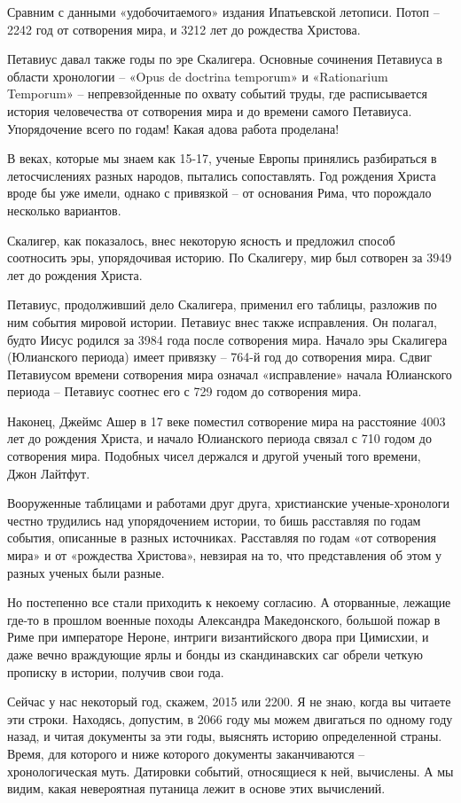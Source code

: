 Сравним с данными «удобочитаемого» издания Ипатьевской летописи. Потоп – 2242 год от сотворения мира, и 3212 лет до рождества Христова.

Петавиус давал также годы по эре Скалигера. Основные сочинения Петавиуса в области хронологии –  «Opus de doctrina temporum» и «Rationarium Temporum» – непревзойденные по охвату событий труды, где расписывается история человечества от сотворения мира и до времени самого Петавиуса. Упорядочение всего по годам! Какая адова работа проделана!

В веках, которые мы знаем как 15-17, ученые Европы принялись разбираться в летосчислениях разных народов, пытались сопоставлять. Год рождения Христа вроде бы уже имели, однако с привязкой – от основания Рима, что порождало несколько вариантов.

Скалигер, как показалось, внес некоторую ясность и предложил способ соотносить эры, упорядочивая историю. По Скалигеру, мир был сотворен за 3949 лет до рождения Христа.

Петавиус, продолживший дело Скалигера, применил его таблицы, разложив по ним события мировой истории. Петавиус внес также исправления. Он полагал, будто Иисус родился за 3984 года после сотворения мира. Начало эры Скалигера (Юлианского периода) имеет привязку – 764-й год до сотворения мира. Сдвиг Петавиусом времени сотворения мира означал «исправление» начала Юлианского периода – Петавиус соотнес его с 729 годом до сотворения мира.

Наконец, Джеймс Ашер в 17 веке поместил сотворение мира на расстояние 4003 лет до рождения Христа, и начало Юлианского периода связал с 710 годом до сотворения мира. Подобных чисел держался и другой ученый того времени, Джон Лайтфут.

Вооруженные таблицами и работами друг друга, христианские ученые-хронологи честно трудились над упорядочением истории, то бишь расставляя по годам события, описанные в разных источниках. Расставляя по годам «от сотворения мира» и от «рождества Христова», невзирая на то, что представления об этом у разных ученых были разные.

Но постепенно все стали приходить к некоему согласию. А оторванные, лежащие где-то в прошлом военные походы Александра Македонского, большой пожар в Риме при императоре Нероне, интриги византийского двора при Цимисхии, и даже вечно враждующие ярлы и бонды из скандинавских саг обрели четкую прописку в истории, получив свои года.

Сейчас у нас некоторый год, скажем, 2015 или 2200.  Я не знаю, когда вы читаете эти строки. Находясь, допустим, в 2066 году мы можем двигаться по одному году назад, и читая документы за эти годы, выяснять историю определенной страны. Время, для которого и ниже которого документы заканчиваются – хронологическая муть. Датировки событий, относящиеся к ней, вычислены. А мы видим, какая невероятная путаница лежит в основе этих вычислений.

